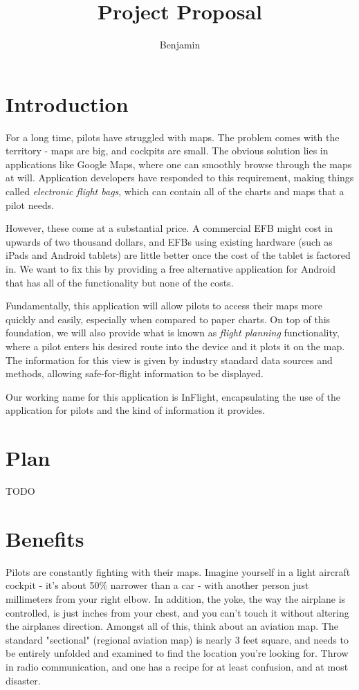 \documentclass[10pt,a4paper]{report}
\author{Benjamin}
\title{Project Proposal}
\begin{document}
\section{Introduction}
For a long time, pilots have struggled with maps. The problem comes with the territory - maps are big, and cockpits are small. The obvious solution lies in applications like Google Maps, where one can smoothly browse through the maps at will. Application developers have responded to this requirement, making things called \emph{electronic flight bags}, which can contain all of the charts and maps that a pilot needs. 

However, these come at a substantial price. A commercial EFB might cost in upwards of two thousand dollars, and EFBs using existing hardware (such as iPads and Android tablets) are little better once the cost of the tablet is factored in. We want to fix this by providing a free alternative application for Android that has all of the functionality but none of the costs.

Fundamentally, this application will allow pilots to access their maps more quickly and easily, especially when compared to paper charts. On top of this foundation, we will also provide what is known as \emph{flight planning} functionality, where a pilot enters his desired route into the device and it plots it on the map. The information for this view is given by industry standard data sources and methods, allowing safe-for-flight information to be displayed.

Our working name for this application is InFlight, encapsulating the use of the application for pilots and the kind of information it provides.
\section{Plan}
TODO
\section{Benefits}
Pilots are constantly fighting with their maps. Imagine yourself in a light aircraft cockpit - it's about 50\% narrower than a car - with another person just millimeters from your right elbow. In addition, the yoke, the way the airplane is controlled, is just inches from your chest, and you can't touch it without altering the airplanes direction. Amongst all of this, think about an aviation map. The standard "sectional" (regional aviation map) is nearly 3 feet square, and needs to be entirely unfolded and examined to find the location you're looking for. Throw in radio communication, and one has a recipe for at least confusion, and at most disaster. 
\end{document}
